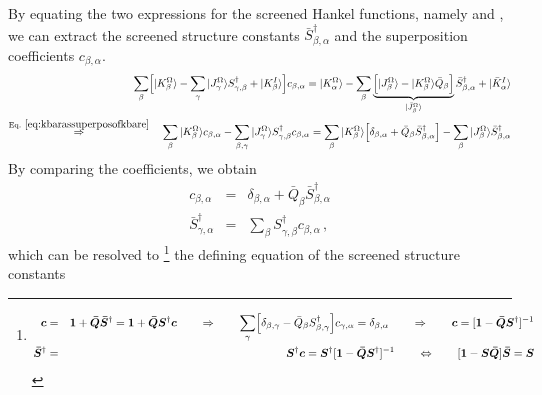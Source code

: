 \documentclass[11pt,a4paper]{report}
\begin{document}
By equating the two expressions for the screened Hankel functions,
namely  and , we can
extract the screened structure constants
$\bar{S}^\dagger_{\beta,\alpha}$ and the superposition coefficients
$c_{\beta,\alpha}$.
\begin{eqnarray}
\sum_\beta\Bigl[|K^\Omega_{\beta}\rangle
-\sum_{\gamma}|J^\Omega_{\gamma}\rangle S^\dagger_{\gamma,\beta}
+|K^I_{\beta}\rangle \Bigr]c_{\beta,\alpha}
=
|K^\Omega_{\alpha}\rangle
-\sum_{\beta}
\underbrace{\Bigl[|J^\Omega_{\beta}\rangle-|K^\Omega_{\beta}\rangle\bar{Q}_\beta\Bigr]}
_{|\bar{J}^\Omega_{\beta}\rangle} \bar{S}^\dagger_{\beta,\alpha}
+|\bar{K}^I_{\alpha}\rangle
\nonumber\\
\eqrel{eq:kbarassuperposofkbare}{\Rightarrow}\quad
\sum_\beta
|K^\Omega_{\beta}\rangle c_{\beta,\alpha}
-\sum_{\beta,\gamma}|J^\Omega_{\gamma}\rangle S^\dagger_{\gamma,\beta} c_{\beta,\alpha}
=
\sum_{\beta}|K^\Omega_{\beta}\rangle
\Bigl[\delta_{\beta,\alpha}+
\bar{Q}_\beta \bar{S}^\dagger_{\beta,\alpha}\Bigr]
-\sum_{\beta}|J^\Omega_{\beta}\rangle \bar{S}^\dagger_{\beta,\alpha}
\nonumber\\
\end{eqnarray}
By comparing the coefficients, we obtain
\begin{eqnarray}
c_{\beta,\alpha}&=&\delta_{\beta,\alpha}+
\bar{Q}_\beta \bar{S}^\dagger_{\beta,\alpha}
\label{eq:definingeqsystemforsbara}
\\
\bar{S}^\dagger_{\gamma,\alpha}&=&\sum_\beta S^\dagger_{\gamma,\beta} c_{\beta,\alpha}
\,,
\label{eq:definingeqsystemforsbar}
\label{eq:definingeqsystemforsbarb}
\end{eqnarray}
which can be resolved to
\footnote{
\begin{eqnarray}
\bm{c}&=&\bm{1}
+\bm{\bar{Q}}\bm{\bar{S}}^\dagger
=\bm{1}+\bm{\bar{Q}}\bm{S}^\dagger\bm{c}
\qquad
\Rightarrow\qquad\sum_\gamma \Bigl[\delta_{\beta,\gamma}
-\bar{Q}_\beta S^\dagger_{\beta,\gamma}\Bigr] c_{\gamma,\alpha}=\delta_{\beta,\alpha}
\qquad\Rightarrow\qquad
\bm{c}=[\bm{1}-\bm{\bar{Q}}\bm{S}^\dagger]^{-1}
\nonumber\\
\bm{\bar{S}}^\dagger&=&\bm{S}^\dagger\bm{c}
=\bm{S}^\dagger[\bm{1}-\bm{\bar{Q}}\bm{S}^\dagger]^{-1}
\qquad\Leftrightarrow\qquad
[\bm{1}-\bm{S}\bm{\bar{Q}}]\bm{\bar{S}}=\bm{S}
\end{eqnarray}
  } the defining
equation of the screened structure constants
\end{document}
